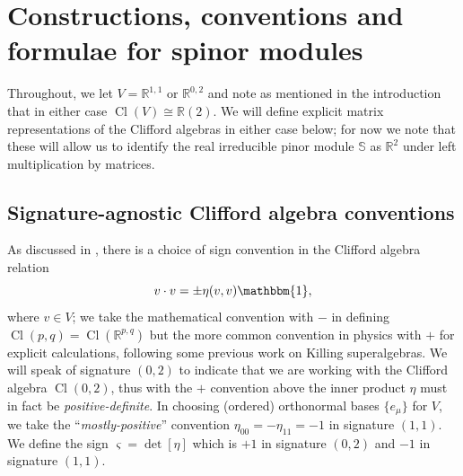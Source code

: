 \documentclass[pdftex]{sigma}
\numberwithin{equation}{section}
\newcommand{\RR}{\mathbb{R}}
\newcommand{\bbS}{\mathbb{S}}
\newcommand{\1}{\mathbbm{1}}
\DeclareMathOperator{\Cl}{Cl}
\begin{document}
\section{Constructions, conventions and formulae for spinor modules}

Throughout, we let $V=\RR^{1,1}$ or $\RR^{0,2}$ and note as mentioned in the introduction that in either case $\Cl(V)\cong\RR(2)$. We will define explicit matrix representations of the Clifford algebras in either case below; for now we note that these will allow us to identify the real irreducible pinor module $\bbS$ as $\RR^2$ under left multiplication by matrices.

\subsection{Signature-agnostic Clifford algebra conventions}
\label{sec:gamma-matrix}

As discussed in \cite[Appendix~A.1.2]{Beckett2024_2}, there is a choice of sign convention in the Clifford algebra relation
\begin{equation}\label{eq:clifford-rel}
	v\cdot v = \pm\eta(v,v)\1,
\end{equation}
where $v\in V$; we take the mathematical convention with $-$ in defining $\Cl(p,q)=\Cl(\RR^{p,q})$ but the more common convention in physics with $+$ for explicit calculations, following some previous work on Killing superalgebras. We will speak of signature $(0,2)$ to indicate that we are working with the Clifford algebra $\Cl(0,2)$, thus with the $+$ convention above the inner product $\eta$ must in fact be \emph{positive-definite}. In choosing (ordered) orthonormal bases $\{e_\mu\}$ for $V$, we take the ``\emph{mostly-positive}'' convention $\eta_{00}=-\eta_{11}=-1$ in signature $(1,1)$. We define the sign
$
	\varsigma=\det[\eta]
$
which is $+1$ in signature $(0,2)$ and $-1$ in signature $(1,1)$.
\end{document}
